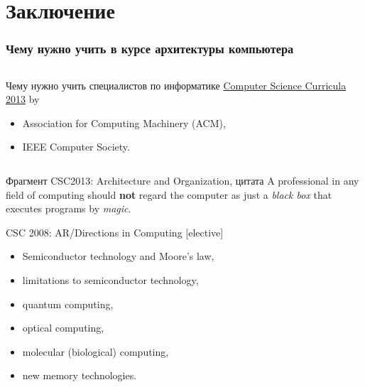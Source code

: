 \section{Заключение}

\begin{frame}
\frametitle{Чему нужно учить в курсе архитектуры компьютера}
\pause
\begin{columns}
    \column{0cm}
    \column{10cm}
\begin{block}{Чему нужно учить специалистов по информатике}
    \textcolor{blue}{\href{https://www.acm.org/education/CS2013-final-report.pdf}{Computer Science Curricula 2013}}
    \small by
    \begin{itemize}
        \item Association for Computing Machinery (ACM),
        \item IEEE Computer Society.
    \end{itemize}
\end{block}
\end{columns}

\pause
\begin{block}{Фрагмент CSC2013: Architecture and Organization, цитата}
A professional in any field of computing should \textbf{not} regard the computer as just a \emph{black
box} that executes programs by \emph{magic}.
\end{block}
\end{frame}

\begin{frame}{CSC 2008: AR/Directions in Computing [elective]}
\begin{itemize}
    \item Semiconductor technology and Moore’s law,
    \item limitations to semiconductor technology,
    \item quantum computing,
    \item optical computing,
    \item molecular (biological) computing,
    \item new memory technologies.
\end{itemize}
\end{frame}


